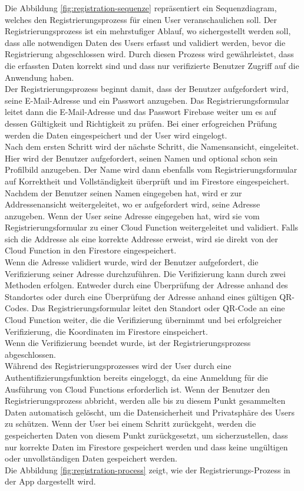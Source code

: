 Die Abbildung \ref{fig:registration-sequenze} repräsentiert ein Sequenzdiagram, welches den Registrierungsprozess für einen User veranschaulichen soll. Der Registrierungsprozess ist ein mehrstufiger Ablauf, wo sichergestellt werden soll, dass alle notwendigen Daten des Users erfasst und validiert werden, bevor die Registrierung abgeschlossen wird. Durch diesen Prozess wird gewährleistet, dass die erfassten Daten korrekt sind und dass nur verifizierte Benutzer Zugriff auf die Anwendung haben.
\\
Der Registrierungsprozess beginnt damit, dass der Benutzer aufgefordert wird, seine E-Mail-Adresse und ein Passwort anzugeben. Das Registrierungsformular leitet dann die E-Mail-Adresse und das Passwort Firebase weiter um es auf dessen Gültigkeit und Richtigkeit zu prüfen. Bei einer erfogreichen Prüfung werden die Daten eingespeichert und der User wird eingelogt.
\\
Nach dem ersten Schritt wird der nächste Schritt, die Namensansicht, eingeleitet. Hier wird der Benutzer aufgefordert, seinen Namen und optional schon sein Profilbild anzugeben. Der Name wird dann ebenfalls vom Registrierungsformular auf Korrektheit und Vollständigkeit überprüft und im Firestore eingespeichert.
\\
Nachdem der Benutzer seinen Namen eingegeben hat, wird er zur Addressenansicht weitergeleitet, wo er aufgefordert wird, seine Adresse anzugeben. Wenn der User seine Adresse eingegeben hat, wird sie vom Registrierungsformular zu einer Cloud Function weitergeleitet und validiert. Falls sich die Addresse als eine korrekte Addresse erweist, wird sie direkt von der Cloud Function in den Firestore eingespeichert.
\\
Wenn die Adresse validiert wurde, wird der Benutzer aufgefordert, die Verifizierung seiner Adresse durchzuführen. Die Verifizierung kann durch zwei Methoden erfolgen. Entweder durch eine Überprüfung der Adresse anhand des Standortes oder durch eine Überprüfung der Adresse anhand eines gültigen QR-Codes. Das Registrierungsformular leitet den Standort oder QR-Code an eine Cloud Function weiter, die die Verifizierung übernimmt und bei erfolgreicher Verifizierung, die Koordinaten im Firestore einspeichert.
\\
Wenn die Verifizierung beendet wurde, ist der Registrierungsprozess abgeschlossen.
\\
Während des Registrierungsprozesses wird der User durch eine Authentifizierungsfunktion bereits eingeloggt, da eine Anmeldung für die Ausführung von Cloud Functions erforderlich ist. Wenn der Benutzer den Registrierungsprozess abbricht, werden alle bis zu diesem Punkt gesammelten Daten automatisch gelöscht, um die Datensicherheit und Privatsphäre des Users zu schützen. Wenn der User bei einem Schritt zurückgeht, werden die gespeicherten Daten von diesem Punkt zurückgesetzt, um sicherzustellen, dass nur korrekte Daten im Firestore gespeichert werden und dass keine ungültigen oder unvollständigen Daten gespeichert werden.
\\
Die Abbildung \ref{fig:registration-process} zeigt, wie der Registrierungs-Prozess in der App dargestellt wird.

